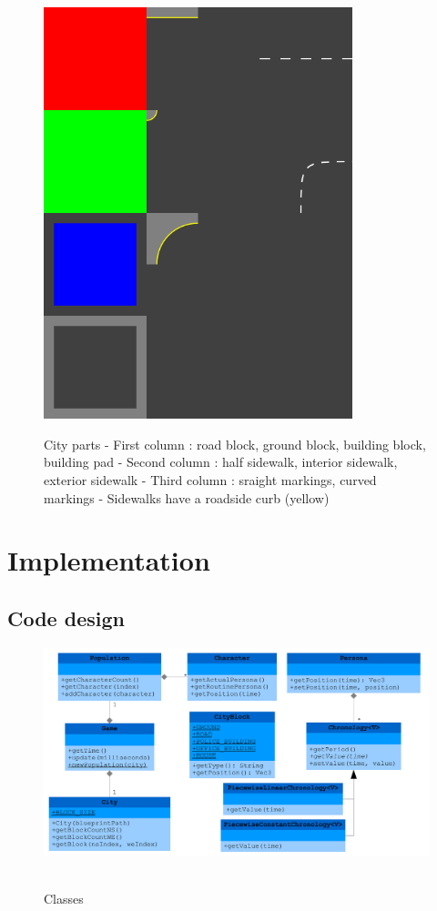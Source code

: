 \documentclass[a4paper, twoside]{article}
\begin{document}
\begin{figure}[h!tbp]
	\centering
	\includegraphics[width=0.8\textwidth]{images/cityparts.png}\ 
	\caption{City parts
		- First column : road block, ground block, building block, building pad
		- Second column : half sidewalk, interior sidewalk, exterior sidewalk
		- Third column : sraight markings, curved markings
		- Sidewalks have a roadside curb (yellow)}
	\label{fig:cityparts}
\end{figure}

\newpage

\section{Implementation}

\subsection{Code design}

\begin{figure}[h!tbp]
	\centering
	\includegraphics[width=1.0\textwidth]{images/classes.pdf}\ 
	\caption{Classes}
	\label{fig:classes}
\end{figure}
\end{document}
